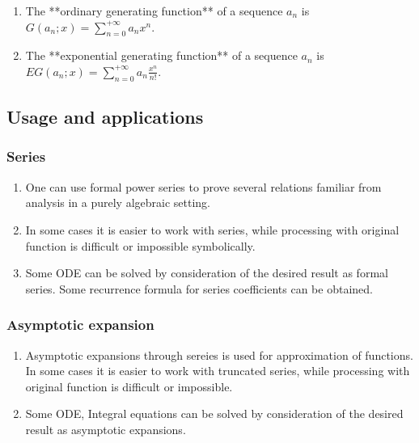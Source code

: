 \documentclass[a4paper]{article}
\begin{document}
    
    \begin{enumerate}
    
        \item The **ordinary generating function** of a sequence $a_n$ is $ G(a_n;x) = \sum_{n=0}^{+\infty} a_n x^n$.
        
        \item The **exponential generating function** of a sequence $a_n$ is $ EG(a_n;x) = \sum_{n=0}^{+\infty} a_n \frac{x^n}{n!}$.
    
    \end{enumerate}

\subsection{Usage and applications}

        
        \subsubsection{Series}
             \begin{enumerate}
                 \item One can use formal power series to prove several relations familiar from analysis in a purely algebraic setting.
                 \item In some cases it is easier to work with series, while processing with original function is difficult or impossible symbolically.
                 \item Some ODE can be solved by consideration of the desired result as formal series. Some recurrence formula for series coefficients can be obtained.
             \end{enumerate}

        \subsubsection{Asymptotic expansion}
             \begin{enumerate}
                \item Asymptotic expansions through sereies is used for approximation of functions. In some cases it is easier to work with truncated series, while processing with original function is difficult or impossible.
                \item Some ODE, Integral equations can be solved by consideration of the desired result as asymptotic expansions.
             \end{enumerate}
\end{document}

